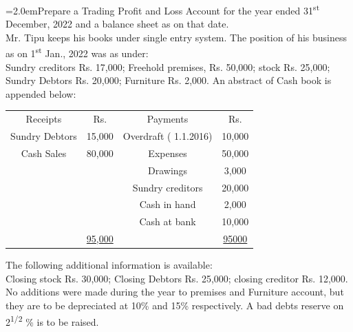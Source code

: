 \documentclass[11pt,a4paper]{article}
\newcommand{\lqn}[2]{\Needspace{6\baselineskip}\par\medskip\noindent\hangindent=2.0em\hangafter=1\makebox[2.0em][l]{\textbf{#1.}}#2\par}
\begin{document}
\lqn{15}{Prepare a Trading Profit and Loss Account for the year ended 31\textsuperscript{st} December, 2022 and a balance sheet as on that date.\\
Mr. Tipu keeps his books under single entry system. The position of his business as on 1\textsuperscript{st}  Jan., 2022 was as under:\\
Sundry creditors Rs. 17,000; Freehold premises, Rs. 50,000; stock Rs. 25,000; Sundry Debtors Rs. 20,000; Furniture Rs. 2,000. An abstract of Cash book is appended below:\par
\par\smallskip\noindent\hspace*{1.2em}\begin{tabular}{|cccc|}
\hline
Receipts & Rs. & Payments & Rs. \\
Sundry Debtors & 15,000 & Overdraft ( 1.1.2016) & 10,000 \\
Cash Sales & 80,000 & Expenses & 50,000 \\
 &  & Drawings & 3,000 \\
 &  & Sundry creditors & 20,000 \\
 &  & Cash in hand & 2,000 \\
 &  & Cash at bank & 10,000 \\
 & \underline{95,000} &  & \underline{95000} \\
\hline
\end{tabular}\par\smallskip
The following additional information is available:\\
Closing stock Rs. 30,000; Closing Debtors Rs. 25,000; closing creditor Rs. 12,000. No additions were made during the year to premises and Furniture account, but they are to be depreciated at 10\% and 15\% respectively. A bad debts reserve on 2\textsuperscript{1/2} \% is to be raised.\par
}
\end{document}
